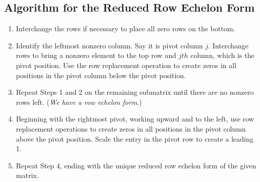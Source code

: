 \documentclass[aima104_lecturenotes_ku.tex]{subfiles}
\begin{document}
\subsection{Algorithm for the Reduced Row Echelon Form}
\begin{enumerate}
    \item Interchange the rows if necessary to place all zero rows on the bottom.
    \item Identify the leftmost nonzero column. Say it is pivot column $j$. Interchange rows to bring a nonzero element to the top row and $jth$ column, which is the pivot position. Use the row replacement operation to create zeros in all positions in the pivot column below the pivot position.

    \item Repeat Steps 1 and 2 on the remaining submatrix until there are no nonzero rows left. (\textit{We have a row echelon form}.)

    \item Beginning with the rightmost pivot, working upward and to the left, use row replacement operations to create zeros in all positions in the pivot column above the pivot position. Scale the entry in the pivot row to create a leading 1.

    \item Repeat Step 4, ending with the unique reduced row echelon form of the given matrix.
\end{enumerate}
\end{document}
